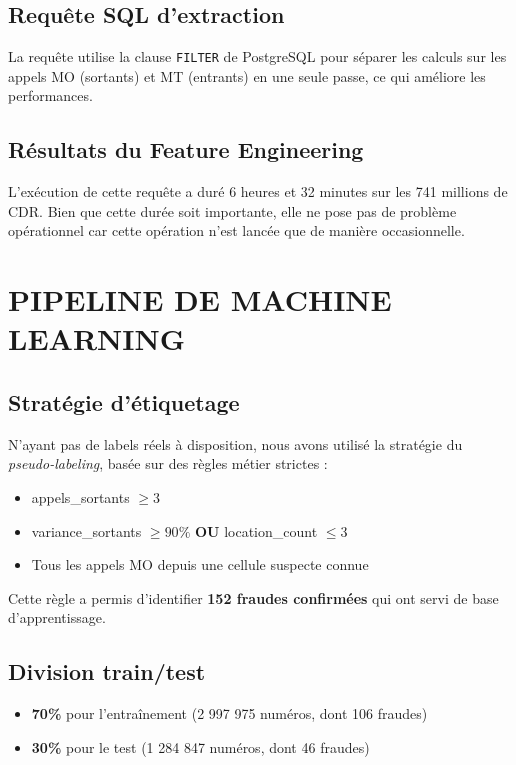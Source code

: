 \documentclass[12pt, oneside, a4paper]{report}
\begin{document}
\subsection{Requête SQL d'extraction}
La requête utilise la clause \texttt{FILTER} de PostgreSQL pour séparer les calculs sur les appels MO (sortants) et MT (entrants) en une seule passe, ce qui améliore les performances.

\subsection{Résultats du Feature Engineering}
L'exécution de cette requête a duré 6 heures et 32 minutes sur les 741 millions de CDR. Bien que cette durée soit importante, elle ne pose pas de problème opérationnel car cette opération n'est lancée que de manière occasionnelle.

\section{PIPELINE DE MACHINE LEARNING}

\subsection{Stratégie d'étiquetage}
N'ayant pas de labels réels à disposition, nous avons utilisé la stratégie du \textit{pseudo-labeling}, basée sur des règles métier strictes :
\begin{itemize}
\item appels\_sortants $\geq 3$
\item variance\_sortants $\geq 90\%$ \textbf{OU} location\_count $\leq 3$
\item Tous les appels MO depuis une cellule suspecte connue
\end{itemize}

Cette règle a permis d'identifier \textbf{152 fraudes confirmées} qui ont servi de base d'apprentissage.

\subsection{Division train/test}
\begin{itemize}
\item \textbf{70\%} pour l'entraînement (2 997 975 numéros, dont 106 fraudes)
\item \textbf{30\%} pour le test (1 284 847 numéros, dont 46 fraudes)
\end{itemize}
\end{document}
